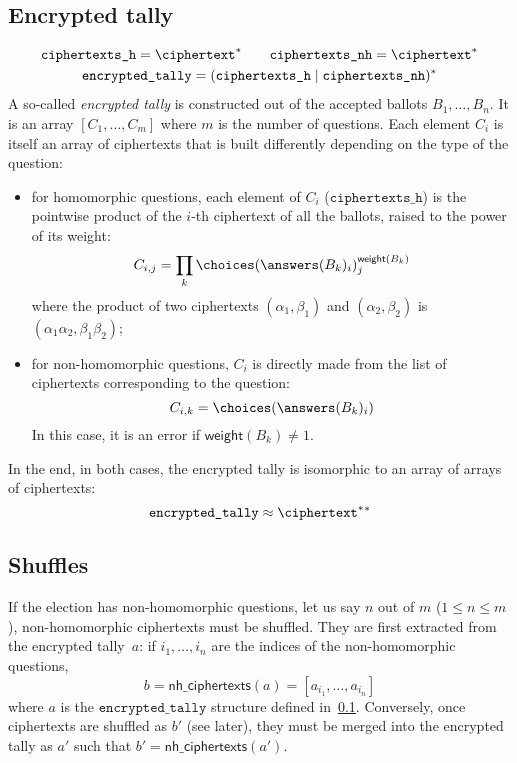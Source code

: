 \documentclass[a4paper]{article}
\newcommand{\etally}{\texttt{encrypted\_tally}}
\begin{document}
\subsection{Encrypted tally}
\label{tally}

\begin{gather*}
  \texttt{ciphertexts\_h}=\ciphertext^\ast
  \qquad
  \texttt{ciphertexts\_nh}=\ciphertext^\ast
  \\
  \etally=(\texttt{ciphertexts\_h}\mid\texttt{ciphertexts\_nh})^\ast
\end{gather*}
A so-called \emph{encrypted tally} is constructed out of the accepted
ballots $B_1,\dots,B_n$.  It is an array $[C_1,\dots,C_m]$ where $m$
is the number of questions. Each element $C_i$ is itself an array of
ciphertexts that is built differently depending on the type of the
question:
\begin{itemize}
\item for homomorphic questions, each element of $C_i$
  ($\texttt{ciphertexts\_h}$) is the pointwise product of the $i$-th
  ciphertext of all the ballots, raised to the power of its weight:
  \[
    C_{i,j}=\prod_{k}\choices(\answers(B_k)_i)_j^{\textsf{weight}(B_k)}
  \]
  where the product of two ciphertexts $(\alpha_1,\beta_1)$ and
  $(\alpha_2,\beta_2)$ is $(\alpha_1\alpha_2,\beta_1\beta_2)$;
\item for non-homomorphic questions, $C_i$ is directly made from the
  list of ciphertexts corresponding to the question:
  \[
    C_{i,k}=\choices(\answers(B_k)_i)
  \]
  In this case, it is an error if $\textsf{weight}(B_k)\neq 1$.
\end{itemize}
In the end, in both cases, the encrypted tally is isomorphic to an
array of arrays of ciphertexts:
\[
\etally\approx\ciphertext^\ast{}^\ast
\]

\subsection{Shuffles}
\label{shuffles}

If the election has non-homomorphic questions, let us say $n$ out of
$m$ ($1\leq n\leq m$), non-homomorphic ciphertexts must be
shuffled. They are first extracted from the encrypted tally~$a$: if
$i_1,\dots,i_n$ are the indices of the non-homomorphic questions,
\[
  b=\textsf{nh\_ciphertexts}(a)=[a_{i_1},\dots,a_{i_n}]
\]
where $a$ is the $\etally$ structure defined
in~\ref{tally}. Conversely, once ciphertexts are shuffled as $b'$ (see
later), they must be merged into the encrypted tally as $a'$ such that
$b'=\textsf{nh\_ciphertexts}(a')$.
\end{document}

